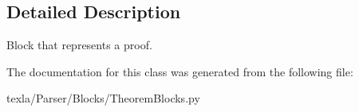 \subsection{Detailed Description}
\begin{DoxyVerb}Block that represents a proof.\end{DoxyVerb}
 

The documentation for this class was generated from the following file\+:\begin{DoxyCompactItemize}
\item 
texla/\+Parser/\+Blocks/Theorem\+Blocks.\+py\end{DoxyCompactItemize}
